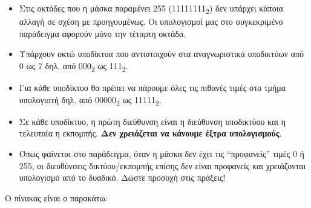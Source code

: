 \begin{itemize}
\item Στις οκτάδες που η μάσκα παραμένει 255 (11111111\textsubscript{2}) δεν υπάρχει κάποια αλλαγή σε σχέση με προηγουμένως. Οι υπολογισμοί μας στο συγκεκριμένο παράδειγμα αφορούν μόνο την τέταρτη οκτάδα.
\item Υπάρχουν οκτώ υποδίκτυα που αντιστοιχούν στα αναγνωριστικά υποδικτύων από 0 ως 7 δηλ. από 000\textsubscript{2} ως 111\textsubscript{2}.
\item Για κάθε υποδίκτυο θα πρέπει να πάρουμε όλες τις πιθανές τιμές στο τμήμα υπολογιστή δηλ. από 00000\textsubscript{2} ως 11111\textsubscript{2}.
\item Σε κάθε υποδίκτυο, η πρώτη διεύθυνση είναι η διεύθυνση υποδικτύου και η τελευταία η εκπομπής. \textbf{Δεν χρειάζεται να κάνουμε έξτρα υπολογισμούς}.
\item Όπως φαίνεται στο παράδειγμα, όταν η μάσκα δεν έχει τις ``προφανείς'' τιμές 0 ή 255, οι διευθύνσεις δικτύου/εκπομπής επίσης δεν είναι προφανείς και χρειάζονται υπολογισμό από το δυαδικό. Δώστε προσοχή στις πράξεις! 
\end{itemize}

Ο πίνακας είναι ο παρακάτω:

